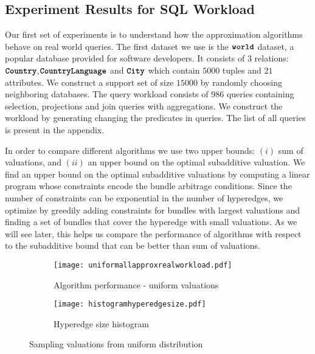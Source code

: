 \subsection{Experiment Results for SQL Workload}

Our first set of experiments is to understand how the approximation algorithms behave on real world queries. The first dataset we use is the $\texttt{\bfseries world}$ dataset, a popular database provided for software developers. It consists of $3$ relations: $\texttt{\bfseries Country}$,$\texttt{\bfseries CountryLanguage}$ and $\texttt{\bfseries City}$ which contain $5000$ tuples and $21$ attributes. We construct a support set of size $15000$ by randomly choosing neighboring databases. The query workload consists of $986$ queries containing selection, projections and join queries with aggregations. We construct the workload by generating changing the predicates in queries. The list of all queries is present in the appendix.

In order to compare different algorithms we use two upper bounds: $(i)$ sum of valuations, and $(ii)$ an upper bound on the optimal subadditive valuation. We find an upper bound on the optimal subadditive valuations by computing a linear program whose constraints encode the bundle arbitrage conditions. Since the number of constraints can be exponential in the number of hyperedges, we optimize by greedily adding constraints for bundles with largest valuations and finding a set of bundles that cover the hyperedge with small valuations. As we will see later, this helps us compare the performance of algorithms with respect to the subadditive bound that can be better than sum of valuations. 

\begin{figure*}[t]
	
	\begin{subfigure}{0.45\textwidth} 
		\hspace{-20mm}
		\texttt{[image: uniformallapproxrealworkload.pdf]}
		\caption{Algorithm performance - uniform valuations} \label{fig:uniformapprox}
	\end{subfigure} 
	\begin{subfigure}{0.45\textwidth} 
		\texttt{[image: histogramhyperedgesize.pdf]}
		\caption{Hyperedge size histogram} \label{fig:histogramrealqueries}
	\end{subfigure} 
	\caption{Sampling valuations from uniform distribution}
\end{figure*}

